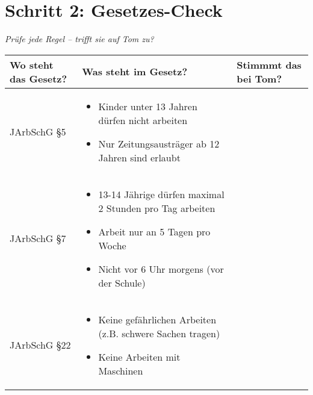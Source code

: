 \documentclass[12pt, a4paper]{article}
\newenvironment{taskbox}{%
    \begin{framed}
        \color{black}
    }{%
    \end{framed}
}
\newcommand{\checkbox}{\raisebox{-0.2ex}{\Large$\square$}}
\begin{document}
    \vspace{0.3cm}

	\pagebreak
	
    \section*{\color{taskblue}Schritt 2: Gesetzes-Check}
    
    \begin{taskbox}
        \textit{Prüfe jede Regel – trifft sie auf Tom zu?}
        
        \begin{tabular}{|p{4cm}|p{8cm}|p{3cm}|}
            \hline
            \textbf{Wo steht das Gesetz?} & \textbf{Was steht im Gesetz?} & \textbf{Stimmmt das bei Tom?} \\ 
            \hline
            JArbSchG §5 & \begin{minipage}[t]{8cm}
                \begin{itemize}[leftmargin=*,nosep]
                    \item Kinder unter 13 Jahren dürfen nicht arbeiten
                    \item Nur Zeitungsausträger ab 12 Jahren sind erlaubt
                \end{itemize}
            \end{minipage} & \checkbox \\ 
            \hline
            JArbSchG §7 & \begin{minipage}[t]{8cm}
                \begin{itemize}[leftmargin=*,nosep]
                    \item 13-14 Jährige dürfen maximal 2 Stunden pro Tag arbeiten
                    \item Arbeit nur an 5 Tagen pro Woche
                    \item Nicht vor 6 Uhr morgens (vor der Schule)
                \end{itemize}
            \end{minipage} & \checkbox \\ 
            \hline
            JArbSchG §22 & \begin{minipage}[t]{8cm}
                \begin{itemize}[leftmargin=*,nosep]
                    \item Keine gefährlichen Arbeiten (z.B. schwere Sachen tragen)
                    \item Keine Arbeiten mit Maschinen

\end{itemize}
\end{minipage}
\end{tabular}
\end{taskbox}
\end{document}
